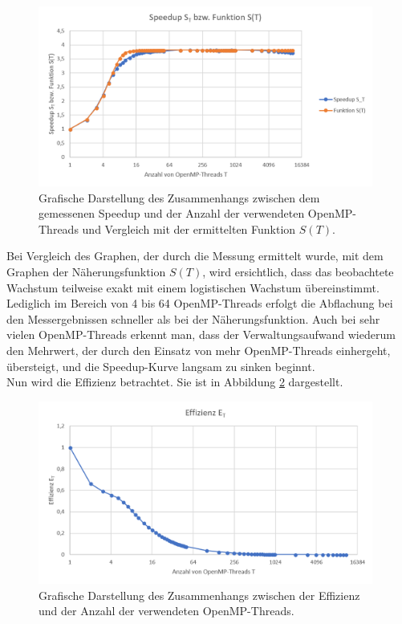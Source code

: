 \begin{description}
						\begin{figure}
							\centering	
							\includegraphics[width=11cm]{Abbildungen/Speedup_OpenMP_Funktion_S(t).png}
							\caption{Grafische Darstellung des Zusammenhangs zwischen dem gemessenen Speedup und der Anzahl der verwendeten OpenMP-Threads und Vergleich mit der ermittelten Funktion $S(T)$.}
							\label{fig:Speedup_OpenMP_Funktion_S(t)}
						\end{figure}
					
						Bei Vergleich des Graphen, der durch die Messung ermittelt wurde, mit dem Graphen der Näherungsfunktion $S(T)$, wird ersichtlich, dass das beobachtete Wachstum teilweise exakt mit einem logistischen Wachstum übereinstimmt. Lediglich im Bereich von 4 bis 64 OpenMP-Threads erfolgt die Abflachung bei den Messergebnissen schneller als bei der Näherungsfunktion. Auch bei sehr vielen OpenMP-Threads erkennt man, dass der Verwaltungsaufwand wiederum den Mehrwert, der durch den Einsatz von mehr OpenMP-Threads einhergeht, übersteigt, und die Speedup-Kurve langsam zu sinken beginnt.\\						
						Nun wird die Effizienz betrachtet. Sie ist in Abbildung \ref{fig:Effizienz_OpenMP} dargestellt.
						
						\begin{figure}
							\centering	
							\includegraphics[width=11cm]{Abbildungen/Effizienz_OpenMP.png}
							\caption{Grafische Darstellung des Zusammenhangs zwischen der Effizienz und der Anzahl der verwendeten OpenMP-Threads.}
							\label{fig:Effizienz_OpenMP}
						\end{figure}


\end{description}
